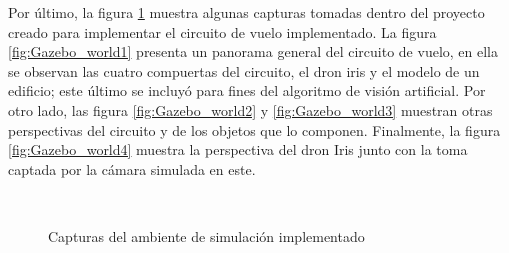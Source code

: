 Por último, la figura \ref{fig:Gazebo_worlds} muestra algunas capturas tomadas dentro del proyecto creado para implementar el circuito de vuelo implementado. La figura \ref{fig:Gazebo_world1} presenta un panorama general del circuito de vuelo, en ella se observan las cuatro compuertas del circuito, el dron iris y el modelo de un edificio; este último se incluyó para fines del algoritmo de visión artificial. Por otro lado, las figura \ref{fig:Gazebo_world2} y \ref{fig:Gazebo_world3}  muestran otras perspectivas del circuito y de los objetos que lo componen. Finalmente, la figura \ref{fig:Gazebo_world4} muestra la perspectiva del dron Iris junto con la toma captada por la cámara simulada en este.

\begin{figure}[ht]
    \centering
    \hfill
    \\
    \hfill
    \hfill

    \caption{Capturas del ambiente de simulación implementado}
    \label{fig:Gazebo_worlds}
\end{figure}

